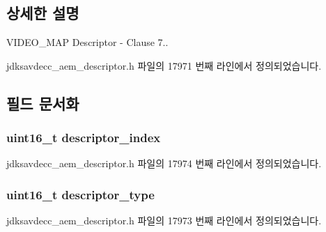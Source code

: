 \subsection{상세한 설명}
V\+I\+D\+E\+O\+\_\+\+M\+AP Descriptor -\/ Clause 7.. 

jdksavdecc\+\_\+aem\+\_\+descriptor.\+h 파일의 17971 번째 라인에서 정의되었습니다.



\subsection{필드 문서화}
\subsubsection[{\texorpdfstring{descriptor\+\_\+index}{descriptor_index}}]{\setlength{\rightskip}{0pt plus 5cm}uint16\+\_\+t descriptor\+\_\+index}\hypertarget{structjdksavdecc__descriptor__video__unit__map_a042bbc76d835b82d27c1932431ee38d4}{}\label{structjdksavdecc__descriptor__video__unit__map_a042bbc76d835b82d27c1932431ee38d4}


jdksavdecc\+\_\+aem\+\_\+descriptor.\+h 파일의 17974 번째 라인에서 정의되었습니다.

\subsubsection[{\texorpdfstring{descriptor\+\_\+type}{descriptor_type}}]{\setlength{\rightskip}{0pt plus 5cm}uint16\+\_\+t descriptor\+\_\+type}\hypertarget{structjdksavdecc__descriptor__video__unit__map_ab7c32b6c7131c13d4ea3b7ee2f09b78d}{}\label{structjdksavdecc__descriptor__video__unit__map_ab7c32b6c7131c13d4ea3b7ee2f09b78d}


jdksavdecc\+\_\+aem\+\_\+descriptor.\+h 파일의 17973 번째 라인에서 정의되었습니다.

